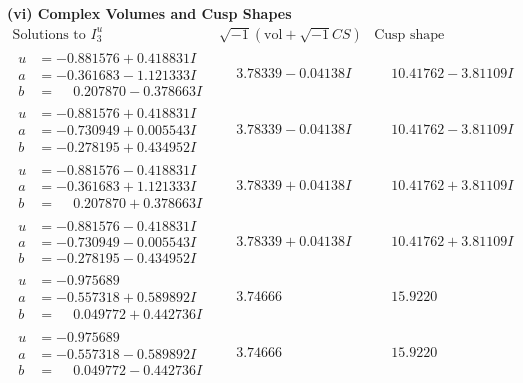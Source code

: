 \documentclass[1p]{elsarticle_modified}
\theoremstyle{definition}
\newcommand{\I}{\sqrt{-1}}
\begin{document}
\newpage\flushleft \textbf{(vi) Complex Volumes and Cusp Shapes}
$$\begin{array}{c|c|c}  
\text{Solutions to }I^u_{3}& \I (\text{vol} + \sqrt{-1}CS) & \text{Cusp shape}\\
 \hline 
\begin{aligned}
u &= -0.881576 + 0.418831 I \\
a &= -0.361683 - 1.121333 I \\
b &= \phantom{-}0.207870 - 0.378663 I\end{aligned}
 & \phantom{-}3.78339 - 0.04138 I & \phantom{-}10.41762 - 3.81109 I \\ \hline\begin{aligned}
u &= -0.881576 + 0.418831 I \\
a &= -0.730949 + 0.005543 I \\
b &= -0.278195 + 0.434952 I\end{aligned}
 & \phantom{-}3.78339 - 0.04138 I & \phantom{-}10.41762 - 3.81109 I \\ \hline\begin{aligned}
u &= -0.881576 - 0.418831 I \\
a &= -0.361683 + 1.121333 I \\
b &= \phantom{-}0.207870 + 0.378663 I\end{aligned}
 & \phantom{-}3.78339 + 0.04138 I & \phantom{-}10.41762 + 3.81109 I \\ \hline\begin{aligned}
u &= -0.881576 - 0.418831 I \\
a &= -0.730949 - 0.005543 I \\
b &= -0.278195 - 0.434952 I\end{aligned}
 & \phantom{-}3.78339 + 0.04138 I & \phantom{-}10.41762 + 3.81109 I \\ \hline\begin{aligned}
u &= -0.975689\phantom{ +0.000000I} \\
a &= -0.557318 + 0.589892 I \\
b &= \phantom{-}0.049772 + 0.442736 I\end{aligned}
 & \phantom{-}3.74666\phantom{ +0.000000I} & \phantom{-}15.9220\phantom{ +0.000000I} \\ \hline\begin{aligned}
u &= -0.975689\phantom{ +0.000000I} \\
a &= -0.557318 - 0.589892 I \\
b &= \phantom{-}0.049772 - 0.442736 I\end{aligned}
 & \phantom{-}3.74666\phantom{ +0.000000I} & \phantom{-}15.9220\phantom{ +0.000000I} \\ \hline\begin{aligned}

\end{aligned}
\end{array}$$
\end{document}
